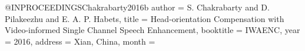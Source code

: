 @INPROCEEDINGS{Chakrabarty2016b
    author = {S. Chakrabarty and D. Pilakeezhu and E. A. P. Habets},
    title = {Head-orientation Compensation with Video-informed Single Channel Speech Enhancement},
    booktitle = IWAENC,
    year = {2016},
    address = {Xian, China},
    month = 
}
